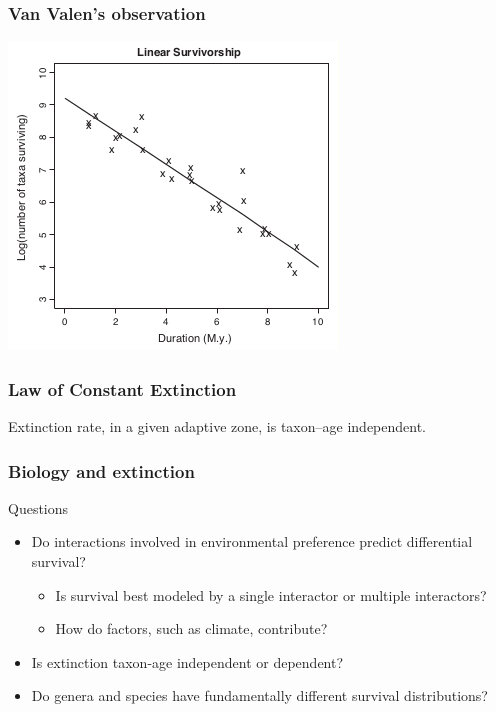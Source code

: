 \documentclass{beamer}
\begin{document}
\begin{frame}
  \frametitle{Van Valen's observation}

  \begin{center}
    \includegraphics[height = 0.7\textheight, keepaspectratio = true]{figure/liow}

    \tiny{}
  \end{center}
\end{frame}

\begin{frame}
  \frametitle{Law of Constant Extinction}

  \begin{definition}
    Extinction rate, in a given adaptive zone, is taxon--age independent.

    \tiny{}
  \end{definition}
\end{frame}

\begin{frame}
  \frametitle{Biology and extinction}

  \begin{block}{Questions}
    \begin{itemize}
      \item Do interactions involved in environmental preference predict differential survival?
        \begin{itemize}
          \item Is survival best modeled by a single interactor or multiple interactors? 
          \item How do factors, such as climate, contribute? 
        \end{itemize}
      \item Is extinction taxon-age independent or dependent?
      \item Do genera and species have fundamentally different survival distributions?
    \end{itemize}
  \end{block}
\end{frame}
\end{document}
